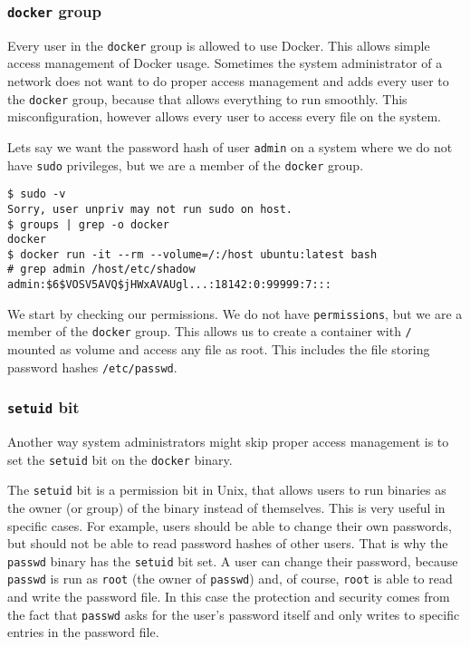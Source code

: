 \subsubsection{\texorpdfstring{\lstinline{docker}}{docker} group}
Every user in the \lstinline{docker} group is allowed to use Docker. This allows simple access management of Docker usage. Sometimes the system administrator of a network does not want to do proper access management and adds every user to the \lstinline{docker} group, because that allows everything to run smoothly. This misconfiguration, however allows every user to access every file on the system.

\hfill

Lets say we want the password hash of user \lstinline{admin} on a system where we do not have \lstinline{sudo} privileges, but we are a member of the \lstinline{docker} group.

\begin{lstlisting}
$ sudo -v
Sorry, user unpriv may not run sudo on host.
$ groups | grep -o docker
docker
$ docker run -it --rm --volume=/:/host ubuntu:latest bash
# grep admin /host/etc/shadow
admin:$6$VOSV5AVQ$jHWxAVAUgl...:18142:0:99999:7:::
\end{lstlisting}

We start by checking our permissions. We do not have \lstinline{permissions}, but we are a member of the \lstinline{docker} group. This allows us to create a container with \lstinline{/} mounted as volume and access any file as root. This includes the file storing password hashes \lstinline{/etc/passwd}.

\subsubsection{\texorpdfstring{\lstinline{setuid}}{setuid} bit}
Another way system administrators might skip proper access management is to set the \lstinline{setuid} bit on the \lstinline{docker} binary.

\hfill

The \lstinline{setuid} bit is a permission bit in Unix, that allows users to run binaries as the owner (or group) of the binary instead of themselves. 
This is very useful in specific cases. For example, users should be able to change their own passwords, but should not be able to read password hashes of other users. That is why the \lstinline{passwd} binary has the \lstinline{setuid} bit set. A user can change their password, because \lstinline{passwd} is run as \lstinline{root} (the owner of \lstinline{passwd}) and, of course, \lstinline{root} is able to read and write the password file. In this case the protection and security comes from the fact that \lstinline{passwd} asks for the user's password itself and only writes to specific entries in the password file.

